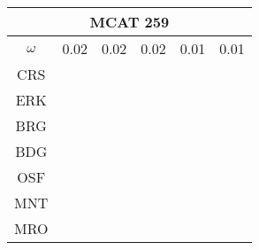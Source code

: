 \documentclass[a4paper,12pt]{article}
\begin{document}
\begin{tabular}{|c|c|c|c|c|c|}%
         \hline \multicolumn{6}{|c|}{MCAT 259} \\ \hline
         $\omega$&0.02&0.02&0.02&0.01&0.01\\ \hline %
        CRS&\cellcolor[HTML]{E41A1C}&\cellcolor[HTML]{E41A1C}&\cellcolor[HTML]{E41A1C}&\cellcolor[HTML]{E41A1C}&\cellcolor[HTML]{E41A1C}\\ \hline %
        ERK&\cellcolor[HTML]{E41A1C}&\cellcolor[HTML]{E41A1C}&\cellcolor[HTML]{377EB8}&\cellcolor[HTML]{377EB8}&\cellcolor[HTML]{377EB8}\\ \hline %
        BRG&\cellcolor[HTML]{377EB8}&\cellcolor[HTML]{377EB8}&\cellcolor[HTML]{4DAF4A}&\cellcolor[HTML]{377EB8}&\cellcolor[HTML]{377EB8}\\ \hline %
        BDG&\cellcolor[HTML]{377EB8}&\cellcolor[HTML]{377EB8}&\cellcolor[HTML]{4DAF4A}&\cellcolor[HTML]{4DAF4A}&\cellcolor[HTML]{4DAF4A}\\ \hline %
        OSF&\cellcolor[HTML]{4DAF4A}&\cellcolor[HTML]{4DAF4A}&\cellcolor[HTML]{984EA3}&\cellcolor[HTML]{4DAF4A}&\cellcolor[HTML]{4DAF4A}\\ \hline %
        MNT&\cellcolor[HTML]{4DAF4A}&\cellcolor[HTML]{4DAF4A}&\cellcolor[HTML]{984EA3}&\cellcolor[HTML]{4DAF4A}&\cellcolor[HTML]{4DAF4A}\\ \hline %
        MRO&\cellcolor[HTML]{4DAF4A}&\cellcolor[HTML]{4DAF4A}&\cellcolor[HTML]{984EA3}&\cellcolor[HTML]{984EA3}&\cellcolor[HTML]{984EA3}\\ \hline %

\end{tabular}
\end{document}
